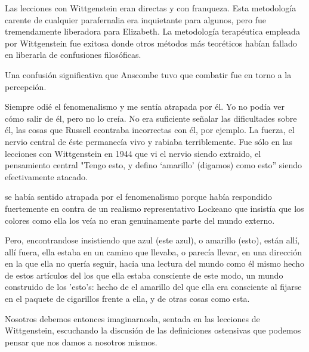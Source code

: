 Las lecciones con Wittgenstein eran directas y con franqueza. Esta metodología
carente de cualquier parafernalia era inquietante para algunos, pero fue
tremendamente liberadora para Elizabeth. La metodología terapéutica empleada por
Wittgenstein fue exitosa donde otros métodos más teoréticos habían fallado en
liberarla de confusiones filosóficas.\autocite[loc 9853 Chapter 4, Section 24,
\S5]{monk1991duty}

Una confusión significativa que Anscombe tuvo que combatir fue en torno a la
percepción.

Siempre odié el fenomenalismo y me sentía atrapada por él. Yo no podía ver cómo
salir de él, pero no lo creía. No era suficiente señalar las dificultades sobre
él, las cosas que Russell econtraba incorrectas con él, por ejemplo. La fuerza,
el nervio central de éste permanecía vivo y rabiaba terriblemente. Fue sólo en
las lecciones con Wittgenstein en 1944 que vi el nervio siendo extraido, el
pensamiento central "Tengo esto, y defino `amarillo' (digamos) como esto''
siendo efectivamente atacado.



se había sentido atrapada por el fenomenalismo porque había respondido
fuertemente en contra de un realismo representativo Lockeano que insistía que
los colores como ella los veía no eran genuinamente parte del mundo externo.

Pero, encontrandose insistiendo que azul (este azul), o amarillo (esto), están
allí, allí fuera, ella estaba en un camino que llevaba, o parecía llevar, en una
dirección en la que ella no quería seguir, hacia una lectura del mundo como él
mismo hecho de estos artículos del los que ella estaba consciente de este modo,
un mundo construido de los 'esto's: hecho de el amarillo del que ella era
consciente al fijarse en el paquete de cigarillos frente a ella, y de otras
cosas como esta.

Nosotros debemos entonces imaginarnosla, sentada en las lecciones de
Wittgenstein, escuchando la discusión de las definiciones ostensivas que podemos
pensar que nos damos a nosotros mismos.
